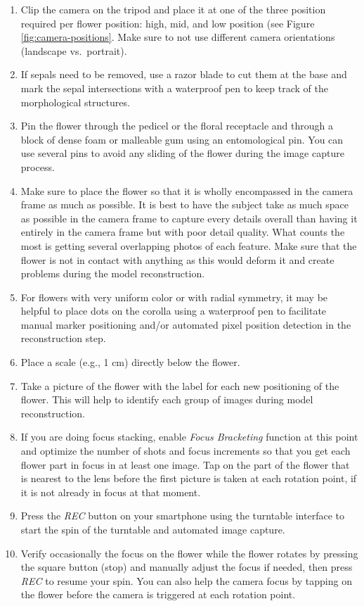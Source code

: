 \documentclass[
]{book}
\begin{document}
\begin{enumerate}
\def\labelenumi{\arabic{enumi}.}
\item
  Clip the camera on the tripod and place it at one of the three position required per flower position:
  high, mid, and low position (see Figure \ref{fig:camera-positions}.
  Make sure to not use different camera orientations (landscape vs.~portrait).
\item
  If sepals need to be removed, use a razor blade to cut them at the
  base and mark the sepal intersections with a waterproof pen to keep
  track of the morphological structures.
\item
  Pin the flower through the pedicel or the floral receptacle and
  through a block of dense foam or malleable gum using an entomological pin.
  You can use several pins to avoid any sliding of the flower during the image
  capture process.
\item
  Make sure to place the flower so that it is wholly
  encompassed in the camera frame as much as possible. It is best to
  have the subject take as much space as possible in the camera
  frame to capture every details overall than having it entirely in
  the camera frame but with poor detail quality. What counts the most
  is getting several overlapping photos of each feature. Make sure
  that the flower is not in contact with anything as this would deform
  it and create problems during the model reconstruction.
\item
  For flowers with very uniform color or with radial symmetry, it may
  be helpful to place dots on the corolla using a waterproof pen to
  facilitate manual marker positioning and/or automated pixel position
  detection in the reconstruction step.
\item
  Place a scale (e.g., 1 cm) directly below the flower.
\item
  Take a picture of the flower with the label for each new positioning
  of the flower. This will help to identify each group of images during model reconstruction.
\item
  If you are doing focus stacking, enable \emph{Focus Bracketing} function at this point and
  optimize the number of shots and focus increments so that you get each
  flower part in focus in at least one image. Tap on the part of the flower that
  is nearest to the lens before the first picture is taken at each rotation point,
  if it is not already in focus at that moment.
\item
  Press the \emph{REC} button on your smartphone using the turntable
  interface to start the spin of the turntable and automated image
  capture.
\item
  Verify occasionally the focus on the flower while the flower rotates
  by pressing the square button (stop) and manually adjust the focus
  if needed, then press \emph{REC} to resume your spin. You can also help the camera
  focus by tapping on the flower before the camera is triggered at each rotation point.
\end{enumerate}
\end{document}
